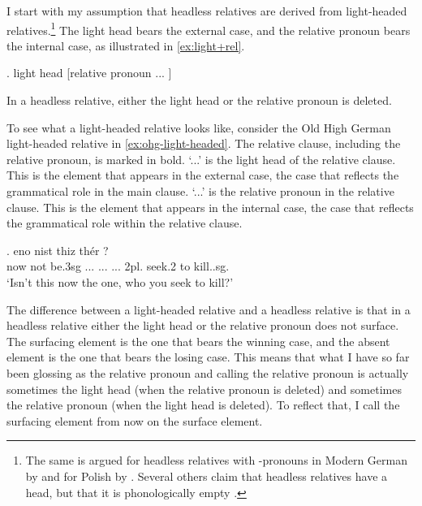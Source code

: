 I start with my assumption that headless relatives are derived from light-headed relatives.\footnote{
The same is argued for headless relatives with -pronouns in Modern German by \citet{fuss2014,hanink2018} and for Polish by \citet{citko2004}.
Several others claim that headless relatives have a head, but that it is phonologically empty \citep[cf.][]{bresnan1978,groos1981,himmelreich2017}.
}
The light head bears the external case, and the relative pronoun bears the internal case, as illustrated in \ref{ex:light+rel}.

\ex. light head [relative pronoun ... ]\label{ex:light+rel}

In a headless relative, either the light head or the relative pronoun is deleted.

To see what a light-headed relative looks like, consider the Old High German light-headed relative in \ref{ex:ohg-light-headed}. The relative clause, including the relative pronoun, is marked in bold.
 `...' is the light head of the relative clause. This is the element that appears in the external case, the case that reflects the grammatical role in the main clause.
 `...' is the relative pronoun in the relative clause. This is the element that appears in the internal case, the case that reflects the grammatical role within the relative clause.

\exg. eno nist thiz thér    
 ?\\
 now {not be.3\ac{sg}}\scsub{[nom]} ... ...
 ... 2\ac{pl}. seek.2\scsub{[acc]} to kill..\ac{sg}.\\
 `Isn't this now the one, who you seek to kill?' \label{ex:ohg-light-headed}

The difference between a light-headed relative and a headless relative is that in a headless relative either the light head or the relative pronoun does not surface.
The surfacing element is the one that bears the winning case, and the absent element is the one that bears the losing case. This means that what I have so far been glossing as the relative pronoun and calling the relative pronoun is actually sometimes the light head (when the relative pronoun is deleted) and sometimes the relative pronoun (when the light head is deleted). To reflect that, I call the surfacing element from now on the surface element.

